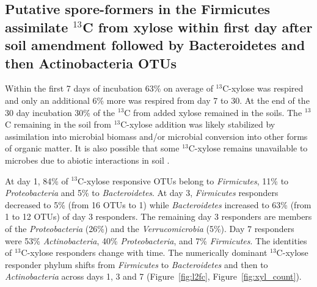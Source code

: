 \subsection{Putative spore-formers in the Firmicutes assimilate $^{13}$C from
xylose within first day after soil amendment followed by Bacteroidetes and then
Actinobacteria OTUs} 
Within the first 7 days of incubation 63\% on average of $^{13}$C-xylose was
respired and only an additional 6\% more was respired from day 7 to 30. At
the end of the 30 day incubation 30\% of the $^{13}$C from added xylose
remained in the soils. The $^{13}$C remaining in the soil from $^{13}$C-xylose
addition was likely stabilized by assimilation into microbial biomass
and/or microbial conversion into other forms of organic matter. It is also
possible that some $^{13}$C-xylose remains unavailable to microbes due to
abiotic interactions in soil \citep{Kalbitz_2000}. 

At day 1, 84\% of $^{13}$C-xylose responsive OTUs belong to
\textit{Firmicutes}, 11\% to \textit{Proteobacteria} and 5\% to
\textit{Bacteroidetes}. At day 3, \textit{Firmicutes} responders decreased to
5\% (from 16 OTUs to 1) while \textit{Bacteroidetes} increased to 63\% (from 1
to 12 OTUs) of day 3 responders. The remaining day 3 responders are members of
the \textit{Proteobacteria} (26\%) and the \textit{Verrucomicrobia} (5\%). Day
7 responders were 53\% \textit{Actinobacteria}, 40\% \textit{Proteobacteria},
and 7\% \textit{Firmicutes}. The identities of $^{13}$C-xylose responders
change with time. The numerically dominant $^{13}$C-xylose responder phylum
shifts from \textit{Firmicutes} to \textit{Bacteroidetes} and then to
\textit{Actinobacteria} across days 1, 3 and 7 (Figure~\ref{fig:l2fc},
Figure~\ref{fig:xyl_count}). 

